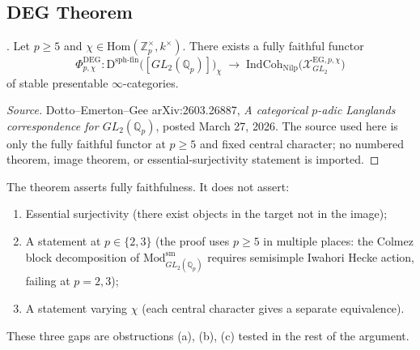 \subsection{DEG Theorem}

\begin{theorem}
\label{v4-arith:deg-f1a:thm:deg-fixed-chi}
\ClaimStatusProvedElsewhere. Let \(p\geq 5\) and
\(\chi\in\mathrm{Hom}(\mathbb{Z}_{p}^{\times},k^{\times})\). There
exists a fully faithful functor
\begin{equation}
\label{v4-arith:deg-f1a:eq:deg-functor}
\Phi^{\mathrm{DEG}}_{p,\chi}\colon
\mathrm{D}^{\mathrm{sph\text{-}fin}}\bigl([GL_{2}(\mathbb{Q}_{p})]\bigr)_{\chi}
\;\longrightarrow\;
\mathrm{IndCoh}_{\mathrm{Nilp}}\bigl(\mathcal{X}^{\mathrm{EG},p,\chi}_{GL_{2}}\bigr)
\end{equation}
of stable presentable \(\infty\)-categories.
\end{theorem}

\begin{proof}[Source]
Dotto--Emerton--Gee arXiv:2603.26887, \emph{A categorical
\(p\)-adic Langlands correspondence for \(GL_{2}(\mathbb Q_p)\)},
posted March 27, 2026.  The source used here is only the fully
faithful functor at \(p\geq 5\) and fixed central character; no
numbered theorem, image theorem, or essential-surjectivity statement
is imported.
\end{proof}

\begin{remark}
\label{v4-arith:deg-f1a:rem:deg-not-assert}
The theorem asserts fully faithfulness. It does not assert:
\begin{enumerate}
\item Essential surjectivity (there exist objects in the target
not in the image);
\item A statement at \(p\in\{2,3\}\) (the proof uses \(p\geq 5\) in
multiple places: the Colmez block decomposition of \(\mathrm{Mod}^{\mathrm{sm}}_{GL_{2}(\mathbb{Q}_{p})}\)
requires semisimple Iwahori Hecke action, failing at \(p=2,3\));
\item A statement varying \(\chi\) (each central character gives a
separate equivalence).
\end{enumerate}
These three gaps are obstructions (a), (b), (c) tested in the
rest of the argument.
\end{remark}

